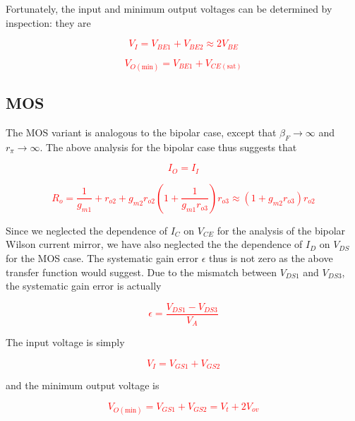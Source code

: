 \par Fortunately, the input and minimum output voltages can be determined by inspection: they are

\textcolor{red}{
\begin{equation}
V_{I}= V_{BE1} + V_{BE2} \approx 2V_{BE}
\end{equation}
}

\textcolor{red}{
\begin{equation}
V_{O(\text{min})} = V_{BE1} + V_{CE(\text{sat})}
\end{equation}
}

\subsection{MOS}
The MOS variant is analogous to the bipolar case, except that $\beta_{F} \rightarrow \infty$ and $r_{\pi} \rightarrow \infty$. The above analysis for the bipolar case thus suggests that

\textcolor{red}{
\begin{equation}
I_{O} = I_{I}
\end{equation}
}

\textcolor{red}{
\begin{equation}
R_{o} = \frac{1}{g_{m1}}+r_{o2}+g_{m2}r_{o2}\left(1+\frac{1}{g_{m1}r_{o3}}\right)r_{o3} \approx (1+g_{m2}r_{o3})r_{o2}
\end{equation}
}

\par Since we neglected the dependence of $I_{C}$ on $V_{CE}$ for the analysis of the bipolar Wilson current mirror, we have also neglected the the dependence of $I_{D}$ on $V_{DS}$ for the MOS case. The systematic gain error $\epsilon$ thus is not zero as the above transfer function would suggest. Due to the mismatch between $V_{DS1}$ and $V_{DS3}$, the systematic gain error is actually

\textcolor{red}{
\begin{equation}
\epsilon = \frac{V_{DS1}-V_{DS3}}{V_{A}}
\end{equation}
}

\par The input voltage is simply

\textcolor{red}{
\begin{equation}
V_{I} = V_{GS1}+V_{GS2}
\end{equation}
}

and the minimum output voltage is

\textcolor{red}{
\begin{equation}
V_{O(\text{min})} = V_{GS1}+V_{GS2} = V_{t}+2V_{ov}
\end{equation}
}

